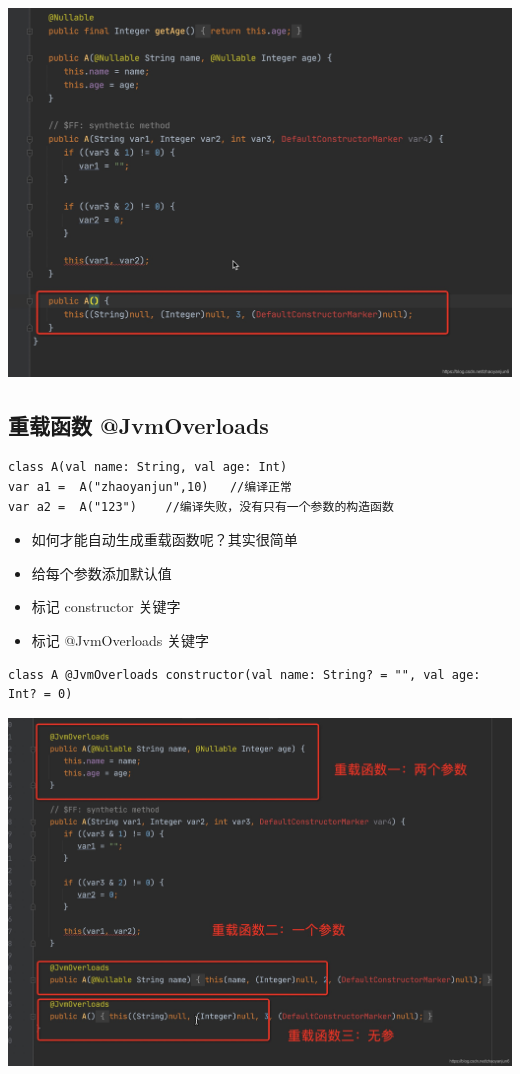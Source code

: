 \documentclass[9pt, b5paper]{article}
\begin{document}
\includegraphics[width=.9\linewidth]{./pic/eg10.png}

\subsection{重载函数 @JvmOverloads}
\label{sec-5-6}
\begin{verbatim}
class A(val name: String, val age: Int)
var a1 =  A("zhaoyanjun",10)   //编译正常
var a2 =  A("123")    //编译失败，没有只有一个参数的构造函数
\end{verbatim}
\begin{itemize}
\item 如何才能自动生成重载函数呢？其实很简单
\item 给每个参数添加默认值
\item 标记 constructor 关键字
\item 标记 @JvmOverloads 关键字
\end{itemize}
\begin{verbatim}
class A @JvmOverloads constructor(val name: String? = "", val age: Int? = 0)
\end{verbatim}

\includegraphics[width=.9\linewidth]{./pic/eg11.png}
\end{document}
